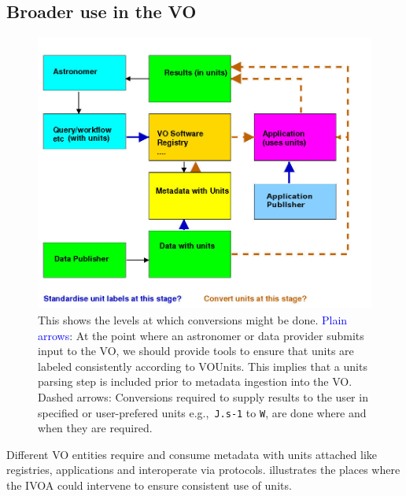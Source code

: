 \documentclass[11pt,notitlepage,onecolumn]{ivoa}
\def\eg{e.g.,~}
\newcommand{\brown}{\textcolor[rgb]{0.50,0.10,0.10}}
\begin{document}
\subsection{Broader use in the VO}

\begin{figure}[thb]
  \includegraphics[width=\textwidth]{./units2.jpg}
  \caption{This shows the levels at which conversions might be done.
\textcolor{blue}{Plain arrows}: At the point where an astronomer or
  data provider submits input to the VO, we should provide tools to
  ensure that units are labeled consistently according to VOUnits. 
  This implies that a units parsing step is included prior to metadata ingestion into the VO.
\brown{Dashed arrows}: Conversions required to supply results to
  the user in specified or user-prefered units \eg  \texttt{J.s-1} to \texttt{W}, are done where and when they are required.}
  \label{fig:units2}
\end{figure}

Different VO entities require and consume metadata with units attached like registries, 
applications and interoperate via protocols.  illustrates the places where the IVOA
could intervene to ensure consistent use of units.


\clearpage

\appendix
\end{document}
